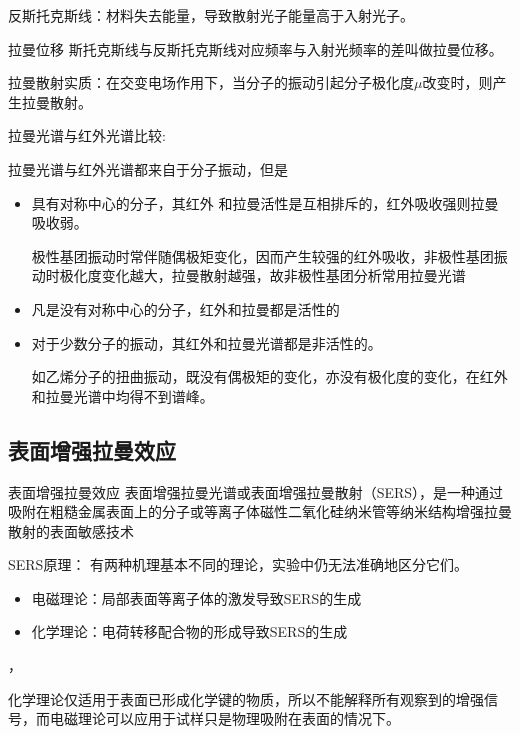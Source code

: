 反斯托克斯线：材料失去能量，导致散射光子能量高于入射光子。
\begin{definition*}{拉曼位移}
	斯托克斯线与反斯托克斯线对应频率与入射光频率的差叫做拉曼位移。
\end{definition*}

拉曼散射实质：在交变电场作用下，当分子的振动引起分子极化度$\mu$改变时，则产生拉曼散射。

\begin{note}

	拉曼光谱与红外光谱比较:
	
	拉曼光谱与红外光谱都来自于分子振动，但是
	\begin{itemize}
		\item 具有对称中心的分子，其红外	和拉曼活性是互相排斥的，红外吸收强则拉曼吸收弱。         \begin{example}
			极性基团振动时常伴随偶极矩变化，因而产生较强的红外吸收，非极性基团振动时极化度变化越大，拉曼散射越强，故非极性基团分析常用拉曼光谱
		\end{example}
		\item 凡是没有对称中心的分子，红外和拉曼都是活性的
		\item 对于少数分子的振动，其红外和拉曼光谱都是非活性的。
		\begin{example}
			如乙烯分子的扭曲振动，既没有偶极矩的变化，亦没有极化度的变化，在红外和拉曼光谱中均得不到谱峰。
		\end{example}
	\end{itemize}

\end{note}

\subsection{表面增强拉曼效应}
\begin{definition*}{表面增强拉曼效应}
	表面增强拉曼光谱或表面增强拉曼散射（SERS），是一种通过吸附在粗糙金属表面上的分子或等离子体磁性二氧化硅纳米管等纳米结构增强拉曼散射的表面敏感技术
\end{definition*}

SERS原理：
有两种机理基本不同的理论，实验中仍无法准确地区分它们。
\begin{itemize}
	\item 电磁理论：局部表面等离子体的激发导致SERS的生成
	\item 化学理论：电荷转移配合物的形成导致SERS的生成
\end{itemize}，
\begin{note}
	化学理论仅适用于表面已形成化学键的物质，所以不能解释所有观察到的增强信号，而电磁理论可以应用于试样只是物理吸附在表面的情况下。
\end{note}

